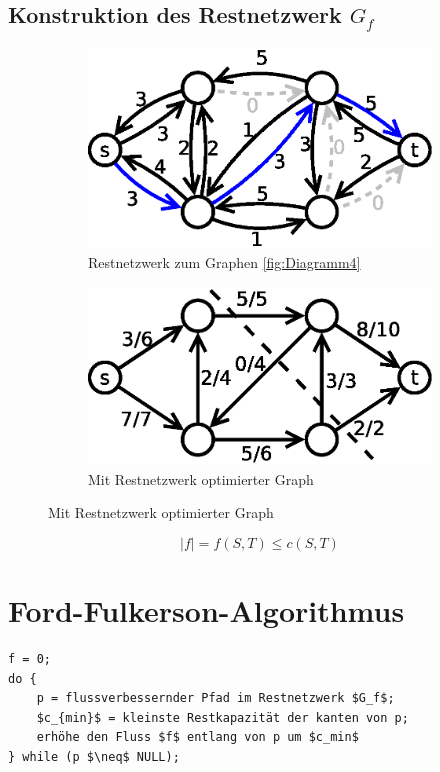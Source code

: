 \subsection{Konstruktion des Restnetzwerk $G_f$}
\begin{figure}[H]
\centering
\begin{subfigure}[H]{0.3\linewidth}
\includegraphics[width=\linewidth]{24/Grafik/Diagramm6}
\caption{Restnetzwerk zum Graphen \ref{fig:Diagramm4}}
\end{subfigure}
\begin{subfigure}[H]{0.3\linewidth}
\includegraphics[width=\linewidth]{24/Grafik/Diagramm7}
\caption{Mit Restnetzwerk optimierter Graph}
\end{subfigure}	
\label{fig:Diagramm6}
\end{figure}
\[ |f| = f(S,T) \leq c(S,T) \]
\section{Ford-Fulkerson-Algorithmus}
\begin{lstlisting}
f = 0;
do {
	p = flussverbessernder Pfad im Restnetzwerk $G_f$;
	$c_{min}$ = kleinste Restkapazität der kanten von p;
	erhöhe den Fluss $f$ entlang von p um $c_min$
} while (p $\neq$ NULL);
\end{lstlisting}